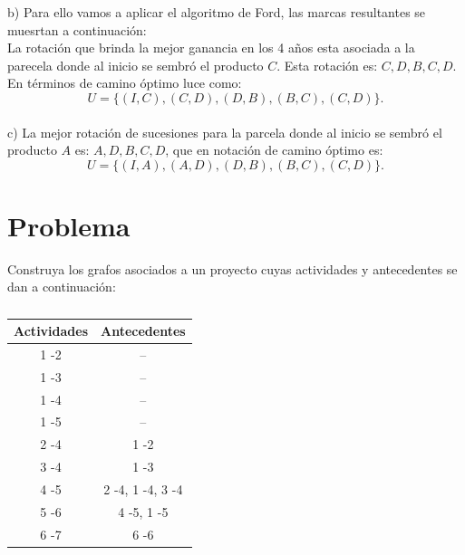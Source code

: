 \documentclass[autocontact]{gaceta}
\begin{document}
        b) Para ello vamos a aplicar el algoritmo de Ford, las marcas resultantes se muesrtan a 
        continuación:
        \\
        La rotación que brinda la mejor ganancia en los 4 años esta asociada a la parecela donde al 
        inicio se sembró el producto $C$. Esta rotación es: $C, D, B, C, D$. En términos de camino 
        óptimo luce como:
        \begin{equation}
            U = \{ (I,C), (C,D), (D,B), (B,C), (C,D) \}.
        \end{equation}\\
        c) La mejor rotación de sucesiones para la parcela donde al inicio se sembró el producto $A$ es:
        $A, D, B, C, D$, que en notación de camino óptimo es:
        \begin{equation}
            U = \{ (I,A), (A,D), (D, B), (B,C), (C,D) \}.
        \end{equation}
        \pagebreak
\section{Problema}
        Construya los grafos asociados a un proyecto cuyas actividades y antecedentes se dan a 
        continuación:
        \begin{table}[h]
            \begin{center}
            
                
            
                \begin{tabular}{|c|c|}
                    \hline
                    Actividades & Antecedentes \\
                    \hline
                    1 -2 & -- \\
                    \hline
                    1 -3 & -- \\
                    \hline
                    1 -4 & -- \\
                    \hline
                    1 -5 & -- \\
                    \hline
                    2 -4 & 1 -2 \\
                    \hline
                    3 -4 & 1 -3 \\
                    \hline 
                    4 -5 & 2 -4, 1 -4, 3 -4 \\
                    \hline 
                    5 -6 & 4 -5, 1 -5 \\
                    \hline
                    6 -7 & 6 -6                    \\
                    \hline                      
                
                \end{tabular}   
            
            \end{center}
            \caption{}
        \end{table}
\end{document}
